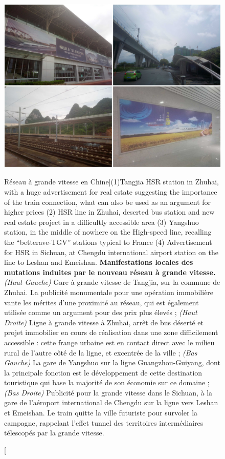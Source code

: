 \begin{figure}
	\includegraphics[width=\linewidth]{Figures/Final/1-3-1-fig-qualitative-hsr}
	\caption[][Réseau à grande vitesse en Chine]{(1)Tangjia HSR station in Zhuhai, with a huge advertisement for real estate suggesting the importance of the train connection, what can also be used as an argument for higher prices  (2) HSR line in Zhuhai, deserted bus station and new real estate project in a difficultly accessible area  (3) Yangshuo station, in the middle of nowhere on the High-speed line, recalling the “betterave-TGV” stations typical to France (4) Advertisement for HSR in Sichuan, at Chengdu international airport station on the line to Leshan and Emeishan. \label{fig:qualitative:hsr}}{\textbf{Manifestations locales des mutations induites par le nouveau réseau à grande vitesse.} \textit{(Haut Gauche)} Gare à grande vitesse de Tangjia, sur la commune de Zhuhai. La publicité monumentale pour une opération immobilière vante les mérites d'une proximité au réseau, qui est également utilisée comme un argument pour des prix plus élevés ; \textit{(Haut Droite)} Ligne à grande vitesse à Zhuhai, arrêt de bus déserté et projet immobilier en cours de réalisation dans une zone difficilement accessible : cette frange urbaine est en contact direct avec le milieu rural de l'autre côté de la ligne, et excentrée de la ville ; \textit{(Bas Gauche)} La gare de Yangshuo sur la ligne Guangzhou-Guiyang, dont la principale fonction est le développement de cette destination touristique qui base la majorité de son économie sur ce domaine ; \textit{(Bas Droite)} Publicité pour la grande vitesse dans le Sichuan, à la gare de l'aéroport international de Chengdu sur la ligne vers Leshan et Emeishan. Le train quitte la ville futuriste pour survoler la campagne, rappelant l'effet tunnel des territoires intermédiaires télescopés par la grande vitesse.\label{fig:qualitative:hsr}}
\end{figure}

